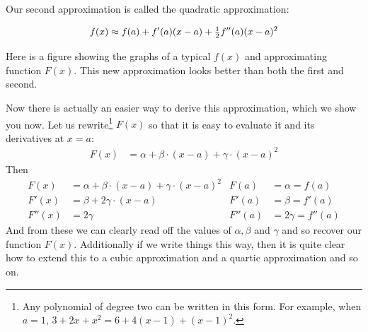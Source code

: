 Our second approximation is called the quadratic approximation:
\begin{impeqn}\label{eq:quadApprox}
\begin{align*}
f(x)\approx f(a)+f'(a)(x-a)+\tfrac{1}{2} f''(a)(x-a)^2
\end{align*}
\end{impeqn}
\noindent Here is a figure showing the graphs
of a typical $f(x)$ and approximating function $F(x)$.
This new approximation looks better than both the first and second.


Now there is actually an easier way to derive this approximation, which we show
you now. Let us rewrite\footnote{Any polynomial of degree two can be written in
this form. For example, when $a=1$, $3 + 2x + x^2 =   6 +  4(x-1) + (x-1)^2$.}
$F(x)$ so that it is easy to evaluate it and its derivatives at $x=a$:
\begin{align*}
  F(x) &= \alpha + \beta\cdot (x-a) + \gamma \cdot(x-a)^2
\end{align*}
Then
\begin{align*}
  F(x) &= \alpha + \beta\cdot (x-a) + \gamma \cdot(x-a)^2 &
  F(a) &= \alpha = f(a) \\
  F'(x) &= \beta + 2\gamma \cdot(x-a) &
  F'(a)&=\beta = f'(a) \\
  F''(x) &= 2\gamma &
  F''(a) &= 2\gamma = f''(a)
\end{align*}
And from these we can clearly read off the values of $\alpha,\beta$ and $\gamma$ and so
recover our function $F(x)$. Additionally if we write things this way, then it is quite
clear how to extend this to a cubic approximation and a quartic approximation and so
on.

